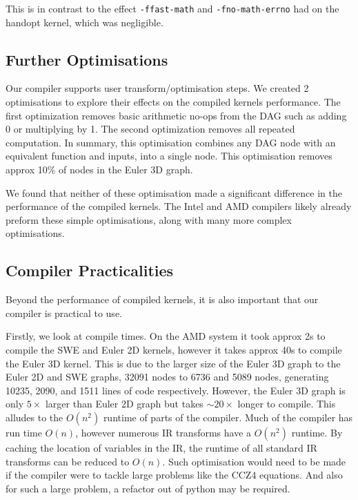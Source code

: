 This is in contrast to the effect \texttt{-ffast-math} and \texttt{-fno-math-errno} had on the handopt kernel, which was negligible.

\subsection{Further Optimisations}

Our compiler supports user transform/optimisation steps.
We created 2 optimisations to explore their effects on the compiled kernels performance.
The first optimization removes basic arithmetic no-ops from the DAG such as adding 0 or multiplying by 1.
The second optimization removes all repeated computation.
In summary, this optimisation combines any DAG node with an equivalent function and inputs, into a single node.
This optimisation removes approx 10\% of nodes in the Euler 3D graph.

We found that neither of these optimisation made a significant difference in the performance of the compiled kernels.
The Intel and AMD compilers likely already preform these simple optimisations, along with many more complex optimisations.

\subsection{Compiler Practicalities} \label{sec:practical}
Beyond the performance of compiled kernels, it is also important that our compiler is practical to use.

Firstly, we look at compile times.
On the AMD system it took approx 2s to compile the SWE and Euler 2D kernels, however it takes approx 40s to compile the Euler 3D kernel.
This is due to the larger size of the Euler 3D graph to the Euler 2D and SWE graphs, 32091 nodes to 6736 and 5089 nodes, generating 10235, 2090, and 1511 lines of code respectively.
However, the Euler 3D graph is only $5\times$ larger than Euler 2D graph but takes $\sim 20\times$ longer to compile.
This alludes to the $O(n^2)$ runtime of parts of the compiler.
Much of the compiler has run time $O(n)$, however numerous IR transforms have a $O(n^2)$ runtime.
By caching the location of variables in the IR, the runtime of all standard IR transforms can be reduced to $O(n)$.
Such optimisation would need to be made if the compiler were to tackle large problems like the CCZ4 equations.
And also for such a large problem, a refactor out of python may be required.

